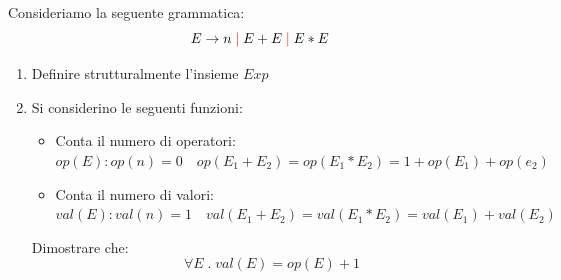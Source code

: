 \documentclass[a4paper]{article}
\begin{document}
\begin{Example}{}{}
    Consideriamo la seguente grammatica:
    \[
      E \to n \color{red}\mid\color{black} E + E \color{red}\mid\color{black} E * E
    \] 
    \begin{enumerate}
      \item Definire strutturalmente l'insieme \( Exp \)
  
      \item Si considerino le seguenti funzioni:
        \begin{itemize}
          \item Conta il numero di operatori:\\
            \( op(E): op(n) = 0 \quad op(E_1 + E_2) = op(E_1 * E_2) = 1 + op(E_1) +
            op(e_2) \)
  
          \item Conta il numero di valori:\\
            \( val(E): val(n) = 1 \quad val(E_1 + E_2) = val(E_1 * E_2) = val(E_1) + val(E_2) \)
        \end{itemize}
        Dimostrare che:
        \[
          \forall E \;.\; val(E) = op(E) + 1
        \] 
    \end{enumerate}
  

\end{Example}
\end{document}

